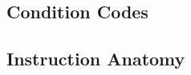 \documentclass[../comorg-part1.tex]{subfiles}
\begin{document}
\begin{landscape}

\end{landscape}


\newpage

\subsection{Condition Codes}


\newpage

\subsection{Instruction Anatomy}
\end{document}
